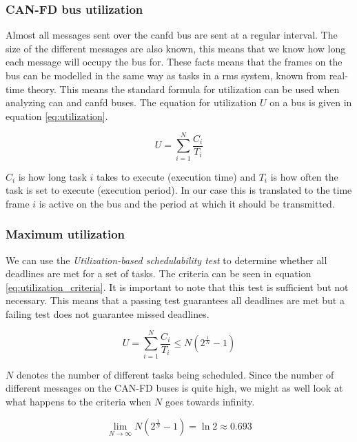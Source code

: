 \subsubsection{CAN-FD bus utilization}

Almost all messages sent over the \acrshort{canfd} bus are sent at a regular interval. The size of the different messages are also known, this means that we know how long each message will occupy the bus for. These facts means that the frames on the bus can be modelled in the same way as tasks in a \acrfull{rms} system, known from real-time theory. This means the standard formula for utilization can be used when analyzing \acrshort{can} and \acrshort{canfd} buses. The equation for utilization $U$ on a bus is given in equation \ref{eq:utilization}. 

\begin{equation}
    U=\sum_{i=1}^N\frac{C_i}{T_i}
    \label{eq:utilization}
\end{equation}

$C_i$ is how long task $i$ takes to execute (execution time) and $T_i$ is how often the task is set to execute (execution period). In our case this is translated to the time frame $i$ is active on the bus and the period at which it should be transmitted. 


\subsubsection{Maximum utilization} \label{sec:max_util}

We can use the \emph{Utilization-based schedulability test} \cite{ttk4147} to determine whether all deadlines are met for a set of tasks. The criteria can be seen in equation \ref{eq:utilization_criteria}. It is important to note that this test is sufficient but not necessary. This means that a passing test guarantees all deadlines are met but a failing test does not guarantee missed deadlines.

\begin{equation}
    U=\sum_{i=1}^N\frac{C_i}{T_i}\leq N\left(2^\frac{1}{N}-1\right)
    \label{eq:utilization_criteria}
\end{equation}

$N$ denotes the number of different tasks being scheduled. Since the number of different messages on the CAN-FD buses is quite high, we might as well look at what happens to the criteria when $N$ goes towards infinity.

\begin{equation}
    \lim_{N\rightarrow\infty} N\left(2^\frac{1}{N}-1\right)=\ln{2}\approx 0.693
    \label{eq:utilization_criteria_calc}
\end{equation}

